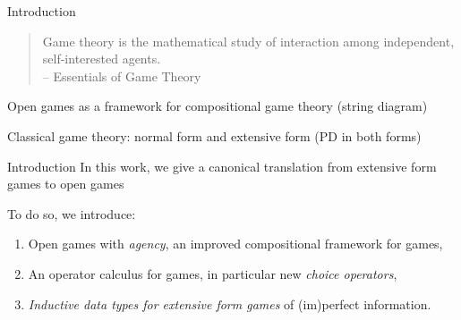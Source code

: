 \begin{frame}{Introduction}
	\vfill
	\begin{quotation}
		Game theory is the mathematical study of interaction among independent, self-interested agents.\\
		{\color{colornote}-- Essentials of Game Theory \cite{leyton2008essentials}}
	\end{quotation}

	Open games as a framework for compositional game theory
	(string diagram)

	Classical game theory: normal form and extensive form
	(PD in both forms)
\end{frame}

\begin{frame}{Introduction}
	In this work, we give a canonical translation from extensive form games to open games


	To do so, we introduce:

	\begin{enumerate}
		\item Open games with \emph{agency}, an improved compositional framework for games,
		\item An operator calculus for games, in particular new \emph{choice operators},
		\item \emph{Inductive data types for extensive form games} of (im)perfect information.
	\end{enumerate}
\end{frame}



